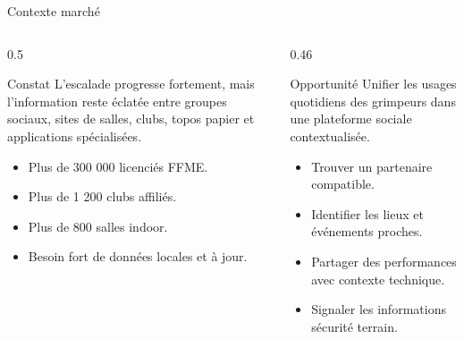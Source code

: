 \documentclass[aspectratio=169,11pt]{beamer}
\begin{document}
\begin{frame}{Contexte marché}
  \begin{columns}[T]
    \begin{column}{0.5\textwidth}
      \begin{block}{Constat}
        L'escalade progresse fortement, mais l'information reste éclatée entre groupes sociaux, sites de salles, clubs, topos papier et applications spécialisées.
      \end{block}
      \begin{itemize}
        \item Plus de 300 000 licenciés FFME.
        \item Plus de 1 200 clubs affiliés.
        \item Plus de 800 salles indoor.
        \item Besoin fort de données locales et à jour.
      \end{itemize}
    \end{column}
    \begin{column}{0.46\textwidth}
      \begin{block}{Opportunité}
        Unifier les usages quotidiens des grimpeurs dans une plateforme sociale contextualisée.
      \end{block}
      \begin{itemize}
        \item Trouver un partenaire compatible.
        \item Identifier les lieux et événements proches.
        \item Partager des performances avec contexte technique.
        \item Signaler les informations sécurité terrain.
      \end{itemize}
    \end{column}
  \end{columns}
\end{frame}
\end{document}
